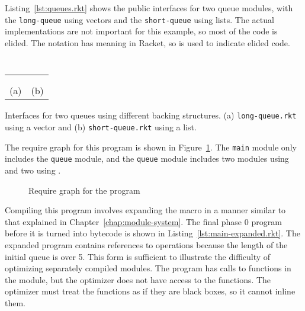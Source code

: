 Listing~\ref{lst:queues.rkt} shows the public interfaces for two queue modules, with the \texttt{long-queue} using vectors and the \texttt{short-queue} using lists. 
The actual implementations are not important for this example, so most of the code is elided.
The  notation has meaning in Racket, so \racket{---} is used to indicate elided code.


\newsavebox{\longqueue}
\begin{lrbox}{\longqueue}
  \begin{minipage}{.5\textwidth}
    \centering
  \inputminted{racket}{listings/long-queue.rkt} 
\end{minipage}
\end{lrbox}

\newsavebox{\shortqueue}
\begin{lrbox}{\shortqueue}
  \begin{minipage}{.5\textwidth}
    \centering
  \inputminted{racket}{listings/short-queue.rkt} 
\end{minipage}
\end{lrbox}

\begin{listing}[t]
  \begin{tabular}{c c}
    \usebox{\longqueue}
    &
    \usebox{\shortqueue}
    \\
    \rule{0pt}{1em} \\
    (a) & (b)
  \end{tabular}
  \caption{Interfaces for two queues using different backing structures. (a) \texttt{long-queue.rkt} using a vector and (b) \texttt{short-queue.rkt} using a list.}
  \label{lst:queues.rkt}
\end{listing}


The require graph for this program is shown in Figure~\ref{fig:queue-modules.tex}.
The \texttt{main} module only includes the \texttt{queue} module, and the \texttt{queue} module includes two modules using  and two using .

\begin{figure}
  
  \caption{Require graph for the  program}
  \label{fig:queue-modules.tex}
\end{figure}

Compiling this program involves expanding the  macro in a manner similar to that explained in Chapter~\ref{chap:module-system}. The final phase 0 program before it is turned into bytecode is shown in Listing~\ref{lst:main-expanded.rkt}.
The expanded program contains references to  operations because the length of the initial queue is over 5.
This form is sufficient to illustrate the difficulty of optimizing separately compiled modules.
The program has calls to functions in the  module, but the optimizer does not have access to the functions.
The optimizer must treat the functions as if they are black boxes, so it cannot inline them.

